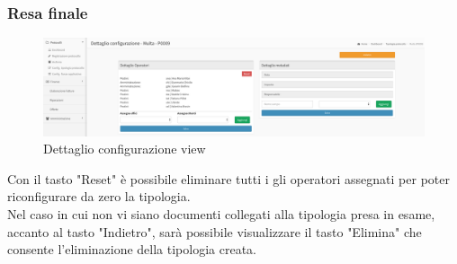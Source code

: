     \subsubsection{Resa finale}
        \begin{figure}[!h] 
            \centering 
            \includegraphics[width=\textwidth]{immagini/prodottofinito/dettaglioconfig.png}
            \caption{Dettaglio configurazione view}
        \end{figure}
        Con il tasto "Reset" è possibile eliminare tutti i gli operatori assegnati per poter riconfigurare da zero la tipologia. 
        \\ 
        Nel caso in cui non vi siano documenti collegati alla tipologia presa in esame, accanto al tasto "Indietro", sarà possibile visualizzare il tasto "Elimina" che consente l'eliminazione della tipologia creata. 
        
        
